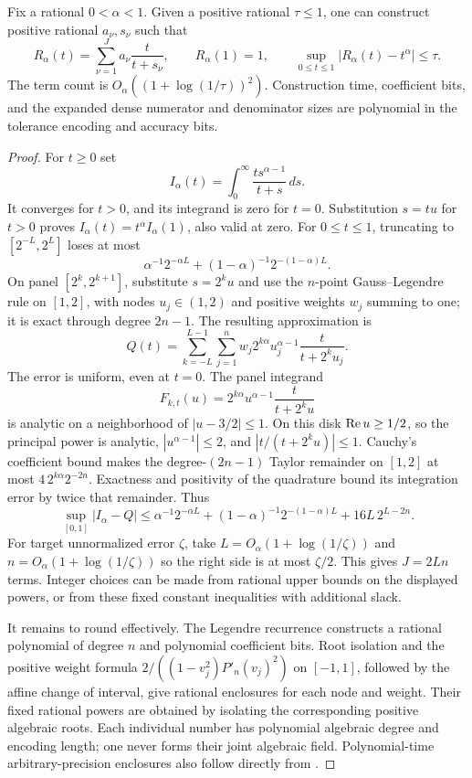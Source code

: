 \begin{lemma}
\label{lem:a-law-positive-rational}
Fix a rational $0<\alpha<1$. Given a positive rational $\tau\le1$,
one can construct positive rational $a_\nu,s_\nu$ such that
\[
 R_\alpha(t)=\sum_{\nu=1}^J a_\nu\frac{t}{t+s_\nu},\qquad
 R_\alpha(1)=1,\qquad
 \sup_{0\le t\le1}|R_\alpha(t)-t^\alpha|\le\tau.
\]
The term count is $O_\alpha((1+\log(1/\tau))^2)$. Construction time,
coefficient bits, and the expanded dense numerator and denominator
sizes are polynomial in the tolerance encoding and accuracy bits.
\end{lemma}
\begin{proof}
For $t\ge0$ set
\[
 I_\alpha(t)=\int_0^\infty\frac{t s^{\alpha-1}}{t+s}\,ds.
\]
It converges for $t>0$, and its integrand is zero for $t=0$.
Substitution $s=tu$ for $t>0$ proves
$I_\alpha(t)=t^\alpha I_\alpha(1)$, also valid at zero. For $0\le t\le1$,
truncating to $[2^{-L},2^L]$ loses at most
\[
 \alpha^{-1}2^{-\alpha L}
       +(1-\alpha)^{-1}2^{-(1-\alpha)L}.
\]
On panel $[2^k,2^{k+1}]$, substitute $s=2^ku$ and use the $n$-point
Gauss--Legendre rule on $[1,2]$, with nodes $u_j\in(1,2)$ and positive
weights $w_j$ summing to one; it is exact through degree $2n-1$.
The resulting approximation is
\[
 Q(t)=\sum_{k=-L}^{L-1}\sum_{j=1}^n
       w_j2^{k\alpha}u_j^{\alpha-1}
       \frac{t}{t+2^ku_j}.
\]
The error is uniform, even at $t=0$. The panel integrand
\[
 F_{k,t}(u)=2^{k\alpha}u^{\alpha-1}\frac{t}{t+2^ku}
\]
is analytic on a neighborhood of $|u-3/2|\le1$. On this disk
$\mathop{\rm Re}u\ge1/2$, so the principal power is analytic,
$|u^{\alpha-1}|\le2$, and $|t/(t+2^ku)|\le1$. Cauchy's coefficient
bound makes the degree-$(2n-1)$ Taylor remainder on $[1,2]$ at most
$4\,2^{k\alpha}2^{-2n}$. Exactness and positivity of the quadrature
bound its integration error by twice that remainder. Thus
\begin{equation}
 \sup_{[0,1]}|I_\alpha-Q|
 \le \alpha^{-1}2^{-\alpha L}
       +(1-\alpha)^{-1}2^{-(1-\alpha)L}
       +16L\,2^{L-2n}.
 \label{eq:a-law-quadrature}
\end{equation}
For target unnormalized error $\zeta$, take $L=O_\alpha(1+\log(1/\zeta))$
and $n=O_\alpha(1+\log(1/\zeta))$ so the right side is at most
$\zeta/2$. This gives $J=2Ln$ terms. Integer choices can be made from
rational upper bounds on the displayed powers, or from these fixed
constant inequalities with additional slack.

It remains to round effectively. The Legendre recurrence
constructs a rational polynomial of degree $n$ and polynomial coefficient
bits. Root isolation and the positive weight formula
$2/((1-v_j^2)P'_n(v_j)^2)$ on $[-1,1]$, followed by the affine change
of interval, give rational enclosures for each node and weight.
Their fixed rational powers are obtained by isolating the corresponding
positive algebraic roots. Each individual number has polynomial algebraic
degree and encoding length; one never forms their joint algebraic field.
Polynomial-time arbitrary-precision enclosures also follow directly from
\citet[Sections 1 and 7.2]{johansson2018-gauss-legendre}.


\end{proof}
